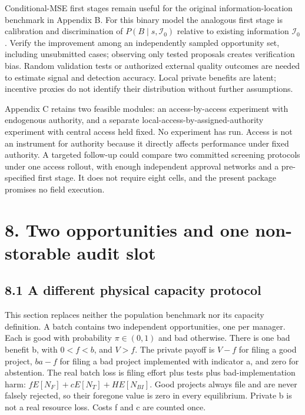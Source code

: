 \documentclass[
  11pt,
]{article}
\begin{document}
Conditional-MSE first stages remain useful for the original
information-location benchmark in Appendix B. For this binary model the
analogous first stage is calibration and discrimination of
\(P(B\mid s,\mathcal I_0)\) relative to existing information
\(\mathcal I_0\). Verify the improvement among an independently sampled
opportunity set, including unsubmitted cases; observing only tested
proposals creates verification bias. Random validation tests or
authorized external quality outcomes are needed to estimate signal and
detection accuracy. Local private benefits are latent; incentive proxies
do not identify their distribution without further assumptions.

Appendix C retains two feasible modules: an access-by-access experiment
with endogenous authority, and a separate
local-access-by-assigned-authority experiment with central access held
fixed. No experiment has run. Access is not an instrument for authority
because it directly affects performance under fixed authority. A
targeted follow-up could compare two committed screening protocols under
one access rollout, with enough independent approval networks and a
pre-specified first stage. It does not require eight cells, and the
present package promises no field execution.

\section{8. Two opportunities and one non-storable audit
slot}\label{two-opportunities-and-one-non-storable-audit-slot}

\subsection{8.1 A different physical capacity
protocol}\label{a-different-physical-capacity-protocol}

This section replaces neither the population benchmark nor its capacity
definition. A batch contains two independent opportunities, one per
manager. Each is good with probability \(\pi\in(0,1)\) and bad
otherwise. There is one bad benefit b, with \(0<f<b\), and \(V>f\). The
private payoff is \(V-f\) for filing a good project, \(b a-f\) for
filing a bad project implemented with indicator a, and zero for
abstention. The real batch loss is filing effort plus tests plus
bad-implementation harm: \(f E[N_F]+c E[N_T]+H E[N_{BI}]\). Good
projects always file and are never falsely rejected, so their foregone
value is zero in every equilibrium. Private b is not a real resource
loss. Costs f and c are counted once.
\end{document}
